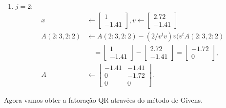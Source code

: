 \begin{questions}
\begin{parts}
\begin{solution}
\begin{enumerate}
                \item $j = 2$:
                    \begin{align*}
                        x &\leftarrow \begin{bmatrix}
                            1 \\
                            -1.41
                        \end{bmatrix}, v \leftarrow \begin{bmatrix}
                            2.72 \\
                            -1.41
                        \end{bmatrix} \\
                        A(2:3, 2:2) &\leftarrow A(2:3, 2:2) - (2 / v^t v) v (v^t A(2:3, 2:2) \\
                        &\quad = \begin{bmatrix}
                            1 \\
                            -1.41
                        \end{bmatrix} - \begin{bmatrix}
                            2.72 \\
                            -1.41
                        \end{bmatrix} = \begin{bmatrix}
                            -1.72 \\
                            0
                        \end{bmatrix}, \\
                        A &\leftarrow \begin{bmatrix}
                            -1.41 & -1.41 \\
                            0 & -1.72 \\
                            0 & 0
                        \end{bmatrix}.
                    \end{align*}
            \end{enumerate}

            Agora vamos obter a fatora\c{c}\~{a}o QR atrav\'{e}es do m\'{e}todo de Givens.


\end{solution}
\end{parts}
\end{questions}
